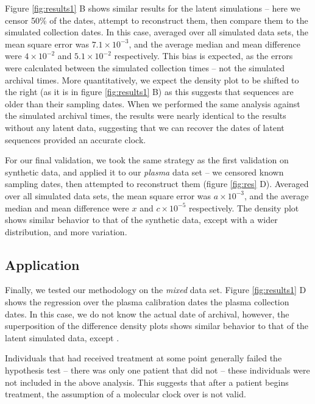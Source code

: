 Figure \ref{fig:results1} B shows similar results for the latent simulations -- here we censor 50\% of the dates, attempt to reconstruct them, then compare them to the simulated collection dates. 
In this case, averaged over all simulated data sets, the mean square error was $7.1\times 10^{-3}$, and the average median and mean difference were $4\times 10^{-2}$ and $5.1\times 10^{-2}$ respectively. 
This bias is expected, as the errors were calculated between the simulated collection times -- not the simulated archival times.
More quantitatively, we expect the density plot to be shifted to the right (as it is in figure \ref{fig:results1} B) as this suggests that sequences are older than their sampling dates.
When we performed the same analysis against the simulated archival times, the results were nearly identical to the results without any latent data, suggesting that we can recover the dates of latent sequences provided an accurate clock.

For our final validation, we took the same strategy as the first validation on synthetic data, and applied it to our {\em plasma} data set -- we censored known sampling dates, then attempted to reconstruct them (figure \ref{fig:res} D). 
Averaged over all simulated data sets, the mean square error was $a\times 10^{-3}$, and the average median and mean difference were $x$ and $c\times 10^{-5}$ respectively. 
The density plot shows similar behavior to that of the synthetic data, except with a wider distribution, and more variation. 

\subsection{Application} \label{sec:mixed_data}

Finally, we tested our methodology on the {\em mixed} data set.
Figure \ref{fig:results1} D shows the regression over the plasma calibration dates the plasma collection dates. 
In this case, we do not know the actual date of archival, however, the superposition of the difference density plots shows similar behavior to that of the latent simulated data, except .  

Individuals that had received treatment at some point generally failed the hypothesis test -- there was only one patient that did not -- these individuals were not included in the above analysis. 
This suggests that after a patient begins treatment, the assumption of a molecular clock over is not valid.

